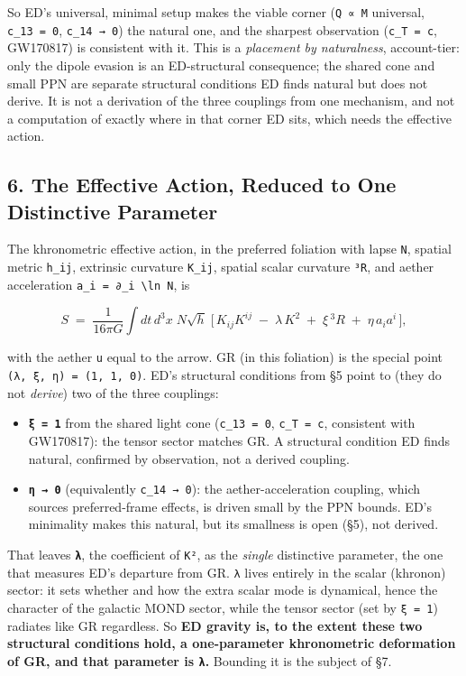 \documentclass[
]{article}
\providecommand{\tightlist}{%
  \setlength{\itemsep}{0pt}\setlength{\parskip}{0pt}}
\begin{document}
So ED's universal, minimal setup makes the viable corner
(\texttt{Q\ ∝\ M} universal, \texttt{c\_13\ =\ 0}, \texttt{c\_14\ →\ 0})
the natural one, and the sharpest observation (\texttt{c\_T\ =\ c},
GW170817) is consistent with it. This is a \emph{placement by
naturalness}, account-tier: only the dipole evasion is an ED-structural
consequence; the shared cone and small PPN are separate structural
conditions ED finds natural but does not derive. It is not a derivation
of the three couplings from one mechanism, and not a computation of
exactly where in that corner ED sits, which needs the effective action.

\subsection{6. The Effective Action, Reduced to One Distinctive
Parameter}\label{the-effective-action-reduced-to-one-distinctive-parameter}

The khronometric effective action, in the preferred foliation with lapse
\texttt{N}, spatial metric \texttt{h\_ij}, extrinsic curvature
\texttt{K\_ij}, spatial scalar curvature \texttt{³R}, and aether
acceleration \texttt{a\_i\ =\ ∂\_i\ \textbackslash{}ln\ N}, is

\[ S \;=\; \frac{1}{16\pi G}\int dt\, d^3x\; N\sqrt{h}\;\Big[\, K_{ij}K^{ij} \;-\; \lambda\, K^2 \;+\; \xi\, {}^3R \;+\; \eta\, a_i a^i \,\Big], \]

with the aether \texttt{u} equal to the arrow. GR (in this foliation) is
the special point \texttt{(λ,\ ξ,\ η)\ =\ (1,\ 1,\ 0)}. ED's structural
conditions from §5 point to (they do not \emph{derive}) two of the three
couplings:

\begin{itemize}
\tightlist
\item
  \textbf{\texttt{ξ\ =\ 1}} from the shared light cone
  (\texttt{c\_13\ =\ 0}, \texttt{c\_T\ =\ c}, consistent with GW170817):
  the tensor sector matches GR. A structural condition ED finds natural,
  confirmed by observation, not a derived coupling.
\item
  \textbf{\texttt{η\ →\ 0}} (equivalently \texttt{c\_14\ →\ 0}): the
  aether-acceleration coupling, which sources preferred-frame effects,
  is driven small by the PPN bounds. ED's minimality makes this natural,
  but its smallness is open (§5), not derived.
\end{itemize}

That leaves \textbf{\texttt{λ}}, the coefficient of \texttt{K²}, as the
\emph{single} distinctive parameter, the one that measures ED's
departure from GR. \texttt{λ} lives entirely in the scalar (khronon)
sector: it sets whether and how the extra scalar mode is dynamical,
hence the character of the galactic MOND sector, while the tensor sector
(set by \texttt{ξ\ =\ 1}) radiates like GR regardless. So \textbf{ED
gravity is, to the extent these two structural conditions hold, a
one-parameter khronometric deformation of GR, and that parameter is
\texttt{λ}.} Bounding it is the subject of §7.
\end{document}
